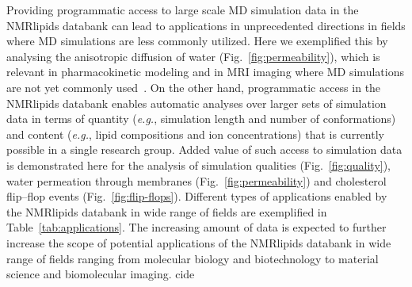 \documentclass[fleqn,10pt]{wlscirep}
\begin{document}
Providing programmatic access to large scale MD simulation data in the NMRlipids databank can lead to applications in unprecedented directions in fields where MD simulations are less commonly utilized. Here we exemplified this by analysing the anisotropic diffusion of water (Fig.~\ref{fig:permeability}), which is relevant in pharmacokinetic modeling and in MRI imaging where MD simulations are not yet commonly used~\cite{nitsche19,topgaard20}. 
On the other hand, programmatic access in the NMRlipids databank enables automatic analyses over larger sets of simulation data in terms of quantity (\textit{e.g.}, simulation length and number of conformations) and content (\textit{e.g.}, lipid compositions and ion concentrations) that is currently possible in a single research group. Added value of such access to simulation data is demonstrated here for the analysis of simulation qualities (Fig.~\ref{fig:quality}), water permeation through membranes (Fig.~\ref{fig:permeability}) and cholesterol flip--flop events (Fig.~\ref{fig:flip-flops}). 
Different types of applications enabled by the NMRlipids databank in wide range of fields are exemplified in Table~\ref{tab:applications}. The increasing amount of data is expected to further increase the scope of potential applications of the NMRlipids databank in wide range of fields ranging from molecular biology and biotechnology to
material science and biomolecular imaging. 
cide
\end{document}
